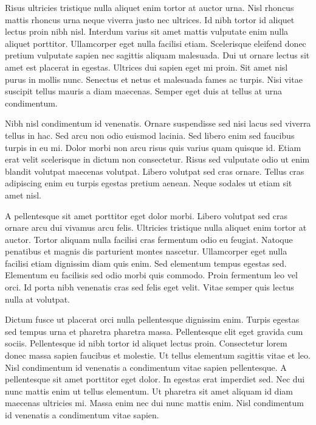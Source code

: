 \documentclass[
]{scrbook}
\begin{document}
Risus ultricies tristique nulla aliquet enim tortor at auctor urna. Nisl rhoncus mattis rhoncus urna neque viverra justo nec ultrices. Id nibh tortor id aliquet lectus proin nibh nisl. Interdum varius sit amet mattis vulputate enim nulla aliquet porttitor. Ullamcorper eget nulla facilisi etiam. Scelerisque eleifend donec pretium vulputate sapien nec sagittis aliquam malesuada. Dui ut ornare lectus sit amet est placerat in egestas. Ultrices dui sapien eget mi proin. Sit amet nisl purus in mollis nunc. Senectus et netus et malesuada fames ac turpis. Nisi vitae suscipit tellus mauris a diam maecenas. Semper eget duis at tellus at urna condimentum.

Nibh nisl condimentum id venenatis. Ornare suspendisse sed nisi lacus sed viverra tellus in hac. Sed arcu non odio euismod lacinia. Sed libero enim sed faucibus turpis in eu mi. Dolor morbi non arcu risus quis varius quam quisque id. Etiam erat velit scelerisque in dictum non consectetur. Risus sed vulputate odio ut enim blandit volutpat maecenas volutpat. Libero volutpat sed cras ornare. Tellus cras adipiscing enim eu turpis egestas pretium aenean. Neque sodales ut etiam sit amet nisl.

A pellentesque sit amet porttitor eget dolor morbi. Libero volutpat sed cras ornare arcu dui vivamus arcu felis. Ultricies tristique nulla aliquet enim tortor at auctor. Tortor aliquam nulla facilisi cras fermentum odio eu feugiat. Natoque penatibus et magnis dis parturient montes nascetur. Ullamcorper eget nulla facilisi etiam dignissim diam quis enim. Sed elementum tempus egestas sed. Elementum eu facilisis sed odio morbi quis commodo. Proin fermentum leo vel orci. Id porta nibh venenatis cras sed felis eget velit. Vitae semper quis lectus nulla at volutpat.

Dictum fusce ut placerat orci nulla pellentesque dignissim enim. Turpis egestas sed tempus urna et pharetra pharetra massa. Pellentesque elit eget gravida cum sociis. Pellentesque id nibh tortor id aliquet lectus proin. Consectetur lorem donec massa sapien faucibus et molestie. Ut tellus elementum sagittis vitae et leo. Nisl condimentum id venenatis a condimentum vitae sapien pellentesque. A pellentesque sit amet porttitor eget dolor. In egestas erat imperdiet sed. Nec dui nunc mattis enim ut tellus elementum. Ut pharetra sit amet aliquam id diam maecenas ultricies mi. Massa enim nec dui nunc mattis enim. Nisl condimentum id venenatis a condimentum vitae sapien.
\end{document}
